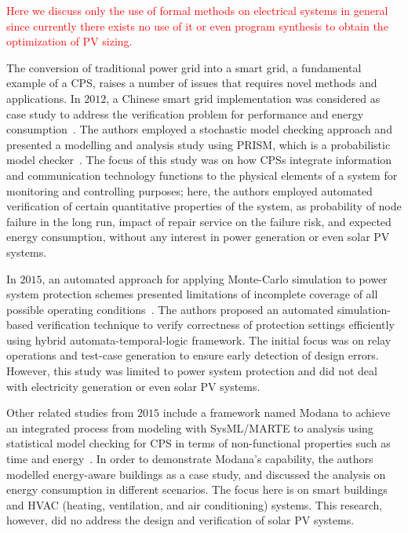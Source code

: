 \documentclass[review]{elsarticle}
\begin{document}
\textcolor{red} {Here we discuss only the use of formal methods on electrical systems in general since currently there exists no use of it or even program synthesis to obtain the optimization of PV sizing.}

The conversion of traditional power grid into a smart grid, a fundamental example of a CPS, 
raises a number of issues that requires novel methods and applications. In $2012$, a Chinese smart grid implementation was considered as case study to address the verification problem for performance and energy consumption~\cite{Yukseletall2012}. The authors employed a stochastic model checking approach and presented a modelling and analysis study using PRISM, which is a probabilistic model checker~\cite{KwiatkowskaNP11}. The focus of this study was on how CPSs integrate information and communication technology functions to the physical elements of a system for monitoring and controlling purposes; here, the authors employed automated verification of certain quantitative properties of the system, as probability of	 node failure in the long run, impact of repair service on the failure risk, and expected energy consumption, without any interest in power generation or even solar PV systems.

In $2015$, an automated approach for applying Monte-Carlo simulation to power system protection schemes presented limitations of incomplete coverage of all possible operating conditions~\cite{Sengupta2015}. The authors proposed an automated simulation-based verification technique to verify correctness of protection settings efficiently using hybrid automata-temporal-logic framework. The initial focus was on relay operations and test-case generation to ensure early detection of design errors. However, this study was limited to power system protection and did not deal with electricity generation or even solar PV systems.

Other related studies from $2015$ include a framework named Modana to achieve an integrated process from modeling with SysML/MARTE to analysis using statistical model checking for CPS in terms of non-functional properties such as time and energy~\cite{Cheng2015}. In order to demonstrate Modana's capability, the authors modelled energy-aware buildings as a case study, and discussed the analysis on energy consumption in different scenarios. The focus here is on smart buildings and HVAC (heating, ventilation, and air conditioning) systems. This research, however, did no address the design and verification of solar PV systems. 
 
\end{document}
